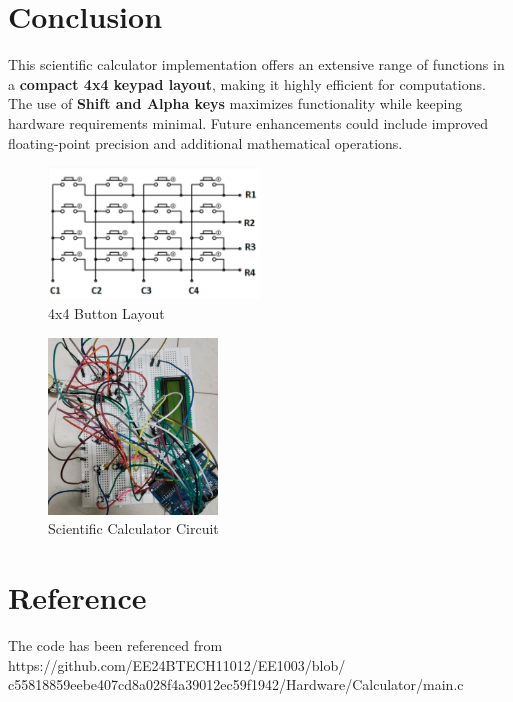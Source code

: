 \documentclass[journal]{IEEEtran}
\numberwithin{equation}{enumi}
\numberwithin{figure}{enumi}
\begin{document}
\section*{Conclusion}
This scientific calculator implementation offers an extensive range of functions in a \textbf{compact 4x4 keypad layout}, making it highly efficient for computations. The use of \textbf{Shift and Alpha keys} maximizes functionality while keeping hardware requirements minimal. Future enhancements could include improved floating-point precision and additional mathematical operations.

\begin{figure}[H]
    \centering
    \includegraphics[width=0.5\textwidth]{4x4_button_layout.png}
    \caption*{4x4 Button Layout}
\end{figure}
\begin{figure}[H]
    \centering
    \includegraphics[width=0.4\textwidth]{sci_calc.jpeg}
    \caption*{Scientific Calculator Circuit}
\end{figure}
\section*{Reference}
The code has been referenced from https://github.com/EE24BTECH11012/EE1003/blob/\\c55818859eebe407cd8a028f4a39012ec59f1942/Hardware/Calculator/main.c
\end{document}
